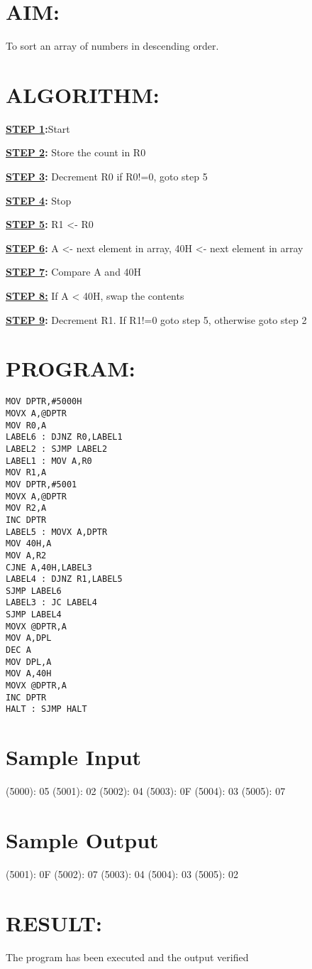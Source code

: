 
%
%
%
%
\section*{AIM:}
To sort an array of numbers in descending order.

\section*{ALGORITHM:}
\textbf{\underline{STEP 1}:}Start

\textbf{\underline{STEP 2}:} Store the count in R0

\textbf{\underline{STEP 3}:} Decrement R0 if R0!=0, goto step 5

\textbf{\underline{STEP 4}:} Stop

\textbf{\underline{STEP 5}:} R1 <- R0 

\textbf{\underline{STEP 6}:} A <- next element in array, 40H <- next element in array

\textbf{\underline{STEP 7}:} Compare A and 40H

\textbf{\underline{STEP 8:}} If A < 40H, swap the contents

\textbf{\underline{STEP 9}:} Decrement R1. If R1!=0 goto step 5, otherwise goto step 2


\section*{PROGRAM:}

\begin{lstlisting}
MOV DPTR,#5000H
MOVX A,@DPTR
MOV R0,A 
LABEL6 : DJNZ R0,LABEL1
LABEL2 : SJMP LABEL2
LABEL1 : MOV A,R0
MOV R1,A
MOV DPTR,#5001
MOVX A,@DPTR
MOV R2,A
INC DPTR
LABEL5 : MOVX A,DPTR
MOV 40H,A
MOV A,R2
CJNE A,40H,LABEL3
LABEL4 : DJNZ R1,LABEL5
SJMP LABEL6
LABEL3 : JC LABEL4
SJMP LABEL4
MOVX @DPTR,A
MOV A,DPL
DEC A
MOV DPL,A
MOV A,40H
MOVX @DPTR,A
INC DPTR
HALT : SJMP HALT 
\end{lstlisting}

\section*{Sample Input}
(5000): 05
(5001): 02
(5002): 04
(5003): 0F
(5004): 03
(5005): 07

\section*{Sample Output}
(5001): 0F
(5002): 07 
(5003): 04
(5004): 03
(5005): 02

\section*{RESULT:}
The program has been executed and the output verified
%
%
%
%
